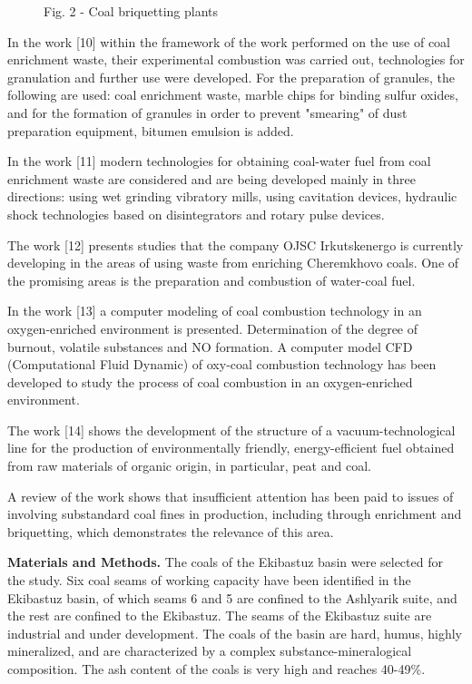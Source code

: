\begin{figure}[H]
\begin{subfigure}{0.45\textwidth}
  \end{subfigure}
  \caption*{Fig. 2 - Coal briquetting plants}
\end{figure}

\begin{multicols}{2}
In the work {[}10{]} within the framework of the work performed on the
use of coal enrichment waste, their experimental combustion was carried
out, technologies for granulation and further use were developed. For
the preparation of granules, the following are used: coal enrichment
waste, marble chips for binding sulfur oxides, and for the formation of
granules in order to prevent "smearing" of dust preparation equipment,
bitumen emulsion is added.

In the work {[}11{]} modern technologies for obtaining coal-water fuel
from coal enrichment waste are considered and are being developed mainly
in three directions: using wet grinding vibratory mills, using
cavitation devices, hydraulic shock technologies based on disintegrators
and rotary pulse devices.

The work {[}12{]} presents studies that the company OJSC Irkutskenergo
is currently developing in the areas of using waste from enriching
Cheremkhovo coals. One of the promising areas is the preparation and
combustion of water-coal fuel.

In the work {[}13{]} a computer modeling of coal combustion technology
in an oxygen-enriched environment is presented. Determination of the
degree of burnout, volatile substances and NO formation. A computer
model CFD (Computational Fluid Dynamic) of oxy-coal combustion
technology has been developed to study the process of coal combustion in
an oxygen-enriched environment.

The work {[}14{]} shows the development of the structure of a
vacuum-technological line for the production of environmentally
friendly, energy-efficient fuel obtained from raw materials of organic
origin, in particular, peat and coal.

A review of the work shows that insufficient attention has been paid to
issues of involving substandard coal fines in production, including
through enrichment and briquetting, which demonstrates the relevance of
this area.

{\bfseries Materials and Methods.} The coals of the Ekibastuz basin were
selected for the study. Six coal seams of working capacity have been
identified in the Ekibastuz basin, of which seams 6 and 5 are confined
to the Ashlyarik suite, and the rest are confined to the Ekibastuz. The
seams of the Ekibastuz suite are industrial and under development. The
coals of the basin are hard, humus, highly mineralized, and are
characterized by a complex substance-mineralogical composition. The ash
content of the coals is very high and reaches 40-49\%.


\end{multicols}
